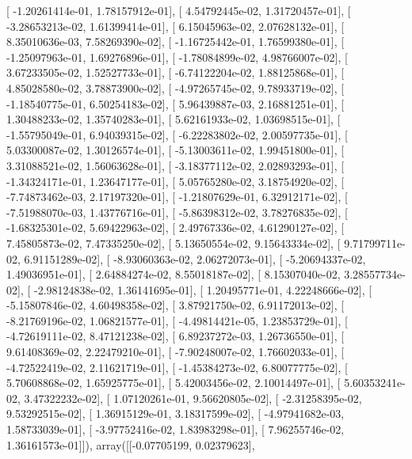 \documentclass{article}
\begin{document}
       [ -1.20261414e-01,   1.78157912e-01],
       [  4.54792445e-02,   1.31720457e-01],
       [ -3.28653213e-02,   1.61399414e-01],
       [  6.15045963e-02,   2.07628132e-01],
       [  8.35010636e-03,   7.58269390e-02],
       [ -1.16725442e-01,   1.76599380e-01],
       [ -1.25097963e-01,   1.69276896e-01],
       [ -1.78084899e-02,   4.98766007e-02],
       [  3.67233505e-02,   1.52527733e-01],
       [ -6.74122204e-02,   1.88125868e-01],
       [  4.85028580e-02,   3.78873900e-02],
       [ -4.97265745e-02,   9.78933719e-02],
       [ -1.18540775e-01,   6.50254183e-02],
       [  5.96439887e-03,   2.16881251e-01],
       [  1.30488233e-02,   1.35740283e-01],
       [  5.62161933e-02,   1.03698515e-01],
       [ -1.55795049e-01,   6.94039315e-02],
       [ -6.22283802e-02,   2.00597735e-01],
       [  5.03300087e-02,   1.30126574e-01],
       [ -5.13003611e-02,   1.99451800e-01],
       [  3.31088521e-02,   1.56063628e-01],
       [ -3.18377112e-02,   2.02893293e-01],
       [ -1.34324171e-01,   1.23647177e-01],
       [  5.05765280e-02,   3.18754920e-02],
       [ -7.74873462e-03,   2.17197320e-01],
       [ -1.21807629e-01,   6.32912171e-02],
       [ -7.51988070e-03,   1.43776716e-01],
       [ -5.86398312e-02,   3.78276835e-02],
       [ -1.68325301e-02,   5.69422963e-02],
       [  2.49767336e-02,   4.61290127e-02],
       [  7.45805873e-02,   7.47335250e-02],
       [  5.13650554e-02,   9.15643334e-02],
       [  9.71799711e-02,   6.91151289e-02],
       [ -8.93060363e-02,   2.06272073e-01],
       [ -5.20694337e-02,   1.49036951e-01],
       [  2.64884274e-02,   8.55018187e-02],
       [  8.15307040e-02,   3.28557734e-02],
       [ -2.98124838e-02,   1.36141695e-01],
       [  1.20495771e-01,   4.22248666e-02],
       [ -5.15807846e-02,   4.60498358e-02],
       [  3.87921750e-02,   6.91172013e-02],
       [ -8.21769196e-02,   1.06821577e-01],
       [ -4.49814421e-05,   1.23853729e-01],
       [ -4.72619111e-02,   8.47121238e-02],
       [  6.89237272e-03,   1.26736550e-01],
       [  9.61408369e-02,   2.22479210e-01],
       [ -7.90248007e-02,   1.76602033e-01],
       [ -4.72522419e-02,   2.11621719e-01],
       [ -1.45384273e-02,   6.80077775e-02],
       [  5.70608868e-02,   1.65925775e-01],
       [  5.42003456e-02,   2.10014497e-01],
       [  5.60353241e-02,   3.47322232e-02],
       [  1.07120261e-01,   9.56620805e-02],
       [ -2.31258395e-02,   9.53292515e-02],
       [  1.36915129e-01,   3.18317599e-02],
       [ -4.97941682e-03,   1.58733039e-01],
       [ -3.97752416e-02,   1.83983298e-01],
       [  7.96255746e-02,   1.36161573e-01]]), array([[-0.07705199,  0.02379623],
\end{document}
